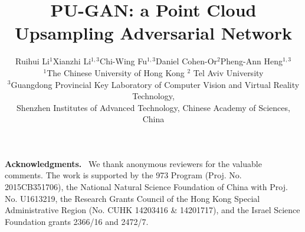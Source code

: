 \documentclass[10pt,twocolumn,letterpaper]{article}
\begin{document}
\title{PU-GAN: a Point Cloud Upsampling Adversarial Network}

\author{Ruihui Li$^{1}$\quad Xianzhi Li$^{1,3}$\quad Chi-Wing Fu$^{1,3}$\quad Daniel Cohen-Or$^2$\quad Pheng-Ann Heng$^{1,3}$\\
	\hspace{-10mm}$^1$The Chinese University of Hong Kong \hspace{10mm} $^2$ Tel Aviv University\\
	$^3$Guangdong Provincial Key Laboratory of Computer Vision and Virtual Reality Technology,\\
	Shenzhen Institutes of Advanced Technology, Chinese Academy of Sciences, China\\
	\hspace{10mm}{\tt\small dcor@mail.tau.ac.il}\qquad
}
\newcommand{\TODO}[1]{{\color{red}{[TODO: #1]}}}
\newcommand{\phil}[1]{{\color[rgb]{0.3,0.7,0.3}{[PH: #1]}}}
\newcommand{\rh}[1]{#1}
\newcommand{\xz}[1]{{\color[rgb]{1.0,0.6,0}{[XZ: #1]}}}
\newcommand{\dc}[1]{{\color{red}{[DC: #1]}}}
\newcommand{\para}[1]{\vspace{.05in}\noindent\textbf{#1}}
\def\ie{\emph{i.e.}}
\def\eg{\emph{e.g.}}
\def\etal{{\em et al.}}
\def\etc{{\em etc.}}

\maketitle








\para{Acknowledgments.} \
We thank anonymous reviewers for the valuable comments.
The work is supported by the 973 Program (Proj. No. 2015CB351706), the National Natural Science Foundation of China with Proj. No. U1613219, the Research Grants Council of the Hong Kong Special Administrative Region (No. CUHK 14203416 \& 14201717), and the Israel Science Foundation grants 2366/16 and 2472/7.

{\small


}
\end{document}
